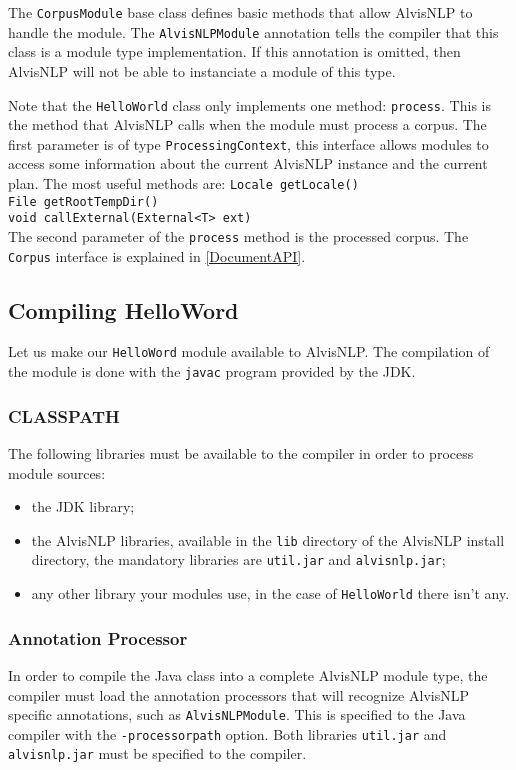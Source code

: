 \documentclass[a4paper]{article}
\begin{document}
The \texttt{CorpusModule} base class defines basic methods that allow AlvisNLP to handle the module.
The \texttt{AlvisNLPModule} annotation tells the compiler that this class is a module type implementation.
If this annotation is omitted, then AlvisNLP will not be able to instanciate a module of this type.

Note that the \texttt{HelloWorld} class only implements one method: \texttt{process}.
This is the method that AlvisNLP calls when the module must process a corpus.
The first parameter is of type \texttt{ProcessingContext}, this interface allows modules to access some information about the current AlvisNLP instance and the current plan.
The most useful methods are:
\texttt{Locale getLocale()}\\
\texttt{File getRootTempDir()}\\
\texttt{void callExternal(External<T> ext)}\\

The second parameter of the \texttt{process} method is the processed corpus.
The \texttt{Corpus} interface is explained in \ref{DocumentAPI}.

\subsection{Compiling HelloWord}
Let us make our \texttt{HelloWord} module available to AlvisNLP.
The compilation of the module is done with the \texttt{javac} program provided by the JDK.

\subsubsection{CLASSPATH}
The following libraries must be available to the compiler in order to process module sources:
\begin{itemize}
\item the JDK library;
\item the AlvisNLP libraries, available in the \texttt{lib} directory of the AlvisNLP install directory, the mandatory libraries are \texttt{util.jar} and \texttt{alvisnlp.jar};
\item any other library your modules use, in the case of \texttt{HelloWorld} there isn't any.
\end{itemize}

\subsubsection{Annotation Processor}
In order to compile the Java class into a complete AlvisNLP module type, the compiler must load the annotation processors that will recognize AlvisNLP specific annotations, such as \texttt{AlvisNLPModule}.
This is specified to the Java compiler with the \texttt{-processorpath} option.
Both libraries \texttt{util.jar} and \texttt{alvisnlp.jar} must be specified to the compiler.
\end{document}
